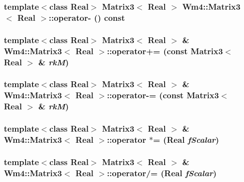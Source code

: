 \subsubsection{\setlength{\rightskip}{0pt plus 5cm}template$<$class Real$>$ {\bf Matrix3}$<$ Real $>$ {\bf Wm4::Matrix3}$<$ Real $>$::operator- () const\hspace{0.3cm}{\tt  [inline]}}\label{classWm4_1_1Matrix3_96381815f5cbd0aadb0f36bc67cc0bcd}


\subsubsection{\setlength{\rightskip}{0pt plus 5cm}template$<$class Real$>$ {\bf Matrix3}$<$ Real $>$ \& {\bf Wm4::Matrix3}$<$ Real $>$::operator+= (const {\bf Matrix3}$<$ Real $>$ \& {\em rk\-M})\hspace{0.3cm}{\tt  [inline]}}\label{classWm4_1_1Matrix3_de318f71df42c592aa945b2f2ccb39c0}


\subsubsection{\setlength{\rightskip}{0pt plus 5cm}template$<$class Real$>$ {\bf Matrix3}$<$ Real $>$ \& {\bf Wm4::Matrix3}$<$ Real $>$::operator-= (const {\bf Matrix3}$<$ Real $>$ \& {\em rk\-M})\hspace{0.3cm}{\tt  [inline]}}\label{classWm4_1_1Matrix3_2228a0f9c127707e67893df8e88adb59}


\subsubsection{\setlength{\rightskip}{0pt plus 5cm}template$<$class Real$>$ {\bf Matrix3}$<$ Real $>$ \& {\bf Wm4::Matrix3}$<$ Real $>$::operator $\ast$= (Real {\em f\-Scalar})\hspace{0.3cm}{\tt  [inline]}}\label{classWm4_1_1Matrix3_cbc0b8383fb6346e8cf46673b0f9d286}


\subsubsection{\setlength{\rightskip}{0pt plus 5cm}template$<$class Real$>$ {\bf Matrix3}$<$ Real $>$ \& {\bf Wm4::Matrix3}$<$ Real $>$::operator/= (Real {\em f\-Scalar})\hspace{0.3cm}{\tt  [inline]}}\label{classWm4_1_1Matrix3_5331277f64785770f2941539613cf464}


